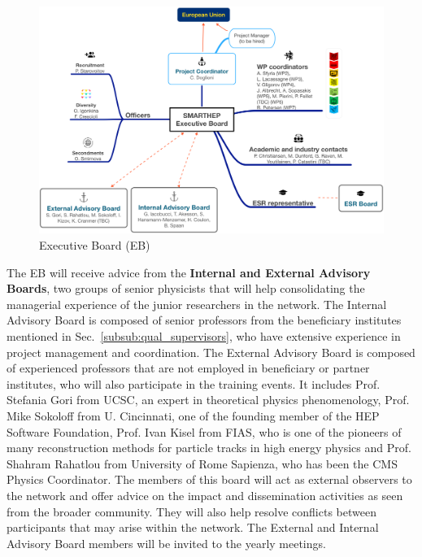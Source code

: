 \begin{figure}
\begin{center}
\includegraphics[width=\textwidth]{figs/SMARTHEP_Boards.png} %
\caption{\acronym Executive Board (EB)}
\label{fig:management}
\end{center}
\vspace{-5mm}
\end{figure}


The EB will receive advice from the \textbf{Internal and External Advisory Boards}, two groups of senior physicists that will help consolidating the managerial experience of the junior researchers in the network. 
The Internal Advisory Board is composed of senior professors from the beneficiary institutes mentioned in Sec.~\ref{subsub:qual_supervisors}, who have extensive experience in project management and coordination. 
The External Advisory Board is composed of experienced professors that are not employed in beneficiary or partner institutes, who will also participate in the training events. 
It includes Prof. Stefania Gori from UCSC, an expert in theoretical physics phenomenology, Prof. Mike Sokoloff from U. Cincinnati, one of the founding member of the HEP Software Foundation, Prof. Ivan Kisel from FIAS, who is one of the pioneers of many reconstruction methods for particle tracks in high energy physics and Prof. Shahram Rahatlou from University of Rome Sapienza, who has been the CMS Physics Coordinator. %
The members of this board will act as external observers to the network and offer advice on the impact and dissemination activities as seen from the broader community. 
They will also help resolve conflicts between participants that may arise within the network.
The External and Internal Advisory Board members will be invited to the \acronym yearly meetings. 

